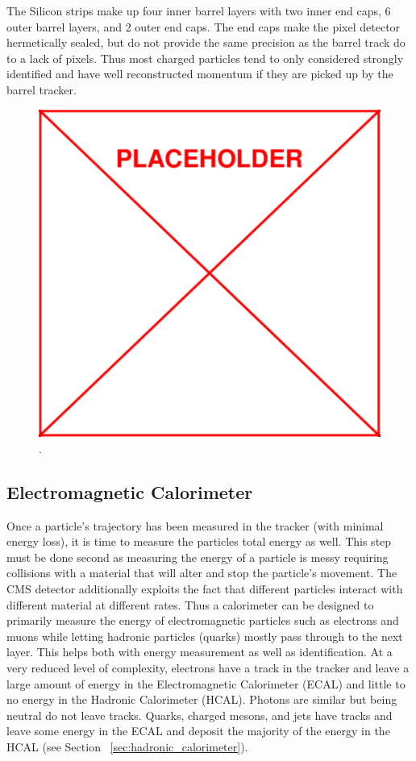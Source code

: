 	The Silicon strips make up four inner barrel layers with two inner end caps, 6 outer barrel layers, and 2 outer end caps. The end caps make the pixel detector hermetically sealed, but do not provide the same precision as the barrel track do to a lack of pixels. Thus most charged particles tend to only considered strongly identified and have well reconstructed momentum if they are picked up by the barrel tracker.\\
	
						\begin{figure}[h]
\begin{center}
\includegraphics[width=0.48\linewidth]{Figs/placeholder.pdf}
\caption{\label{fig:tracker}
.
}
\end{center}
\end{figure}
	
	\subsection{Electromagnetic Calorimeter}
	\label{sec:electromagnetic_calorimeter}
	Once a particle's trajectory has been measured in the tracker (with minimal energy loss), it is time to measure the particles total energy as well. This step must be done second as measuring the energy of a particle is messy requiring collisions with a material that will alter and stop the particle's movement. The CMS detector additionally exploits the fact that different particles interact with different material at different rates. Thus a calorimeter can be designed to primarily measure the energy of electromagnetic particles such as electrons and muons while letting hadronic particles (quarks) mostly pass through to the next layer. This helps both with energy measurement as well as identification. At a very reduced level of complexity, electrons have a track in the tracker and leave a large amount of energy in the Electromagnetic Calorimeter (ECAL) and little to no energy in the Hadronic Calorimeter (HCAL). Photons are similar but being neutral do not leave tracks. Quarks, charged mesons, and jets have tracks and leave some energy in the ECAL and deposit the majority of the energy in the HCAL (see Section ~\ref{sec:hadronic_calorimeter}).\\
	
